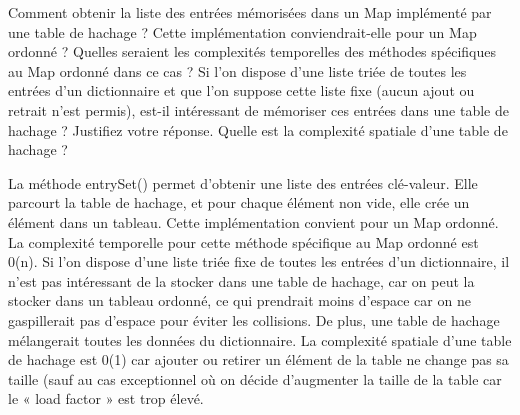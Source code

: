Comment obtenir la liste des entrées mémorisées dans un Map implémenté par une table de hachage ? Cette implémentation conviendrait-elle pour un Map ordonné ? Quelles seraient les complexités temporelles des méthodes spécifiques au Map ordonné dans ce cas ? Si l’on dispose d’une liste triée de toutes les entrées d’un dictionnaire et que l’on suppose cette liste fixe (aucun ajout ou retrait n’est permis), est-il intéressant de mémoriser ces entrées dans une table de hachage ? Justifiez votre réponse. Quelle est la complexité spatiale d’une table de hachage ?

La méthode entrySet() permet d’obtenir une liste des entrées clé-valeur. Elle parcourt la table de hachage, et pour chaque élément non vide, elle crée un élément dans un tableau. Cette implémentation convient pour un Map ordonné. La complexité temporelle pour cette méthode spécifique au Map ordonné est 0(n). Si l’on dispose d’une liste triée fixe de toutes les entrées d’un dictionnaire, il n’est pas intéressant de la stocker dans une table de hachage, car on peut la stocker dans un tableau ordonné, ce qui prendrait moins d’espace car on ne gaspillerait pas d’espace pour éviter les collisions. De plus, une table de hachage mélangerait toutes les données du dictionnaire. La complexité spatiale d’une table de hachage est 0(1) car ajouter ou retirer un élément de la table ne change pas sa taille (sauf au cas exceptionnel où on décide d’augmenter la taille de la table car le « load factor » est trop élevé.
